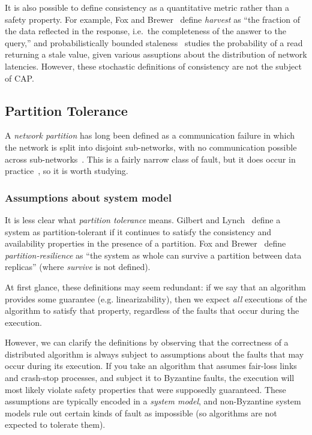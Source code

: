 \documentclass[a4paper,twocolumn,10pt]{article}
\begin{document}
It is also possible to define consistency as a quantitative metric rather than a safety property.
For example, Fox and Brewer~\cite{Fox1999bs} define \emph{harvest} as ``the fraction of the data
reflected in the response, i.e.\ the completeness of the answer to the query,'' and
probabilistically bounded staleness~\cite{Bailis2012to} studies the probability of a read returning
a stale value, given various assuptions about the distribution of network latencies. However, these
stochastic definitions of consistency are not the subject of CAP.

\subsection{Partition Tolerance}\label{sec:partitions}

A \emph{network partition} has long been defined as a communication failure in which the network is
split into disjoint sub-networks, with no communication possible across
sub-networks~\cite{Johnson1975we}. This is a fairly narrow class of fault, but it does occur in
practice~\cite{Bailis2014jx}, so it is worth studying.

\subsubsection{Assumptions about system model}

It is less clear what \emph{partition tolerance} means. Gilbert and Lynch~\cite{Gilbert2002il}
define a system as partition-tolerant if it continues to satisfy the consistency and availability
properties in the presence of a partition. Fox and Brewer~\cite{Fox1999bs} define
\emph{partition-resilience} as ``the system as whole can survive a partition between data replicas''
(where \emph{survive} is not defined).

At first glance, these definitions may seem redundant: if we say that an algorithm provides some
guarantee (e.g. linearizability), then we expect \emph{all} executions of the algorithm to satisfy
that property, regardless of the faults that occur during the execution.

However, we can clarify the definitions by observing that the correctness of a distributed algorithm
is always subject to assumptions about the faults that may occur during its execution. If you take
an algorithm that assumes fair-loss links and crash-stop processes, and subject it to Byzantine
faults, the execution will most likely violate safety properties that were supposedly guaranteed.
These assumptions are typically encoded in a \emph{system model}, and non-Byzantine system models
rule out certain kinds of fault as impossible (so algorithms are not expected to tolerate them).
\end{document}
